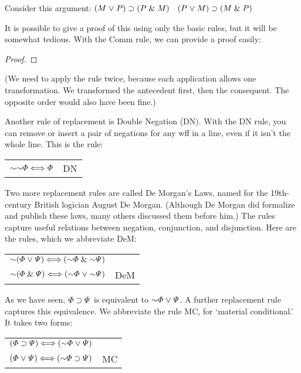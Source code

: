 Consider this argument: $(M \mkern1mu\vee\mkern1mu P) \supset (P \mathrel\& M)$ \therefore\ $(P \mkern1mu\vee\mkern1mu M) \supset (M \mathrel\& P)$

It is possible to give a proof of this using only the basic rules, but it will be somewhat tedious. With the Comm rule, we can provide a proof easily:

\begin{proof}
	 \pr{}
\end{proof}

(We need to apply the rule twice, because each application allows one transformation. We transformed the antecedent first, then the consequent. The opposite order would also have been fine.)

Another rule of replacement is Double Negation (DN). With the DN rule, you can remove or insert a pair of negations for any wff in a line, even if it isn't the whole line. This is the rule:

\begin{center}
\begin{tabular}{rl}
$\enot\enot\metaA{} \Longleftrightarrow \metaA{}$ & DN
\end{tabular}
\end{center}

Two more replacement rules  are called De Morgan's Laws, named for the 19th-century British logician August De Morgan. (Although De Morgan did formalize and publish these laws, many others discussed them before him.) The rules capture useful relations between negation, conjunction, and disjunction. Here are the rules, which we abbreviate DeM:

\begin{center}
\begin{tabular}{rl}
$\enot(\metaA{}\eor\metaB{}) \Longleftrightarrow (\enot\metaA{}\eand\enot\metaB{})$\\
$\enot(\metaA{}\eand\metaB{}) \Longleftrightarrow (\enot\metaA{}\eor\enot\metaB{})$
& DeM
\end{tabular}
\end{center}

As we have seen, $\varPhi{}\supset\varPsi{}$ is equivalent to $\enot\metaA{}\eor\metaB{}$. A further replacement rule captures this equivalence. We abbreviate the rule MC, for `material conditional.' It takes two forms:

\begin{center}
\begin{tabular}{rl}
$(\metaA{}\eif\metaB{}) \Longleftrightarrow (\enot\metaA{}\eor\metaB{})$ &\\
$(\metaA{}\eor\metaB{}) \Longleftrightarrow (\enot\metaA{}\eif\metaB{})$ & MC
\end{tabular}
\end{center}

